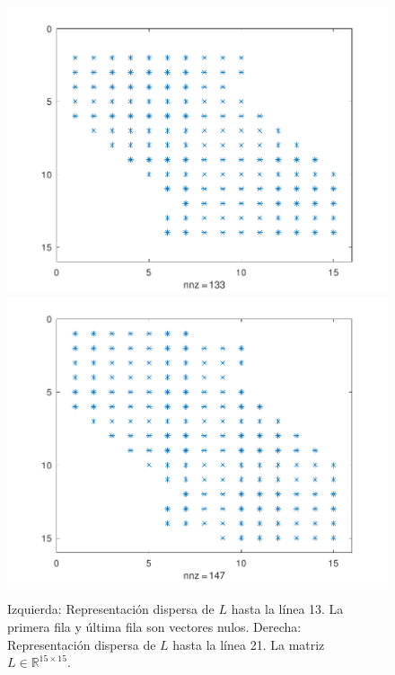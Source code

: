 \begin{problem}
\begin{figure}[ht!]
    \centering
    \includegraphics[width=.39\paperwidth]{../examples/octave/elliptic1Dsparsebefore.pdf}
    \includegraphics[width=.39\paperwidth]{../examples/octave/elliptic1Dsparseafter.pdf}
    \caption{Izquierda: Representación dispersa de $L$ hasta la línea 13.
        La primera fila y última fila son vectores nulos.
        Derecha: Representación dispersa de $L$ hasta la línea 21.
        La matriz $L\in\mathbb{R}^{15\times 15}$.}
\end{figure}


\end{problem}
